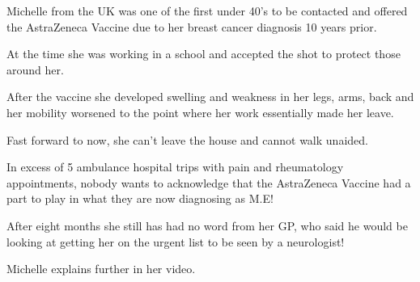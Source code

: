 Michelle from the UK was one of the first under 40’s to be contacted and offered
the AstraZeneca Vaccine due to her breast cancer diagnosis 10 years prior.

At the time she was working in a school and accepted the shot to protect those
around her.

After the vaccine she developed swelling and weakness in her legs, arms, back
and her mobility worsened to the point where her work essentially made her
leave.

Fast forward to now, she can’t leave the house and cannot walk unaided.

In excess of 5 ambulance hospital trips with pain and rheumatology appointments,
nobody wants to acknowledge that the AstraZeneca Vaccine had a part to play in
what they are now diagnosing as M.E!

After eight months she still has had no word from her GP, who said he would be
looking at getting her on the urgent list to be seen by a neurologist!

Michelle explains further in her video.

